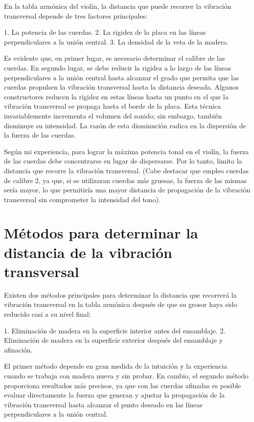 \documentclass[12pt]{book}
\begin{document}
En la tabla armónica del violín, la distancia que puede recorrer la vibración transversal depende de tres factores principales:  

1. La potencia de las cuerdas.  
2. La rigidez de la placa en las líneas perpendiculares a la unión central.  
3. La densidad de la veta de la madera.  

Es evidente que, en primer lugar, es necesario determinar el calibre de las cuerdas. En segundo lugar, se debe reducir la rigidez a lo largo de las líneas perpendiculares a la unión central hasta alcanzar el grado que permita que las cuerdas propulsen la vibración transversal hasta la distancia deseada. Algunos constructores reducen la rigidez en estas líneas hasta un punto en el que la vibración transversal se propaga hasta el borde de la placa. Esta técnica invariablemente incrementa el volumen del sonido; sin embargo, también disminuye su intensidad. La razón de esta disminución radica en la dispersión de la fuerza de las cuerdas.  

Según mi experiencia, para lograr la máxima potencia tonal en el violín, la fuerza de las cuerdas debe concentrarse en lugar de dispersarse. Por lo tanto, limito la distancia que recorre la vibración transversal. (Cabe destacar que empleo cuerdas de calibre 2, ya que, si se utilizaran cuerdas más gruesas, la fuerza de las mismas sería mayor, lo que permitiría una mayor distancia de propagación de la vibración transversal sin comprometer la intensidad del tono).

\section*{Métodos para determinar la distancia de la vibración transversal}

Existen dos métodos principales para determinar la distancia que recorrerá la vibración transversal en la tabla armónica después de que su grosor haya sido reducido casi a su nivel final:  

1. Eliminación de madera en la superficie interior antes del ensamblaje.  
2. Eliminación de madera en la superficie exterior después del ensamblaje y afinación.  

El primer método depende en gran medida de la intuición y la experiencia cuando se trabaja con madera nueva y sin probar. En cambio, el segundo método proporciona resultados más precisos, ya que con las cuerdas afinadas es posible evaluar directamente la fuerza que generan y ajustar la propagación de la vibración transversal hasta alcanzar el punto deseado en las líneas perpendiculares a la unión central.
\end{document}
